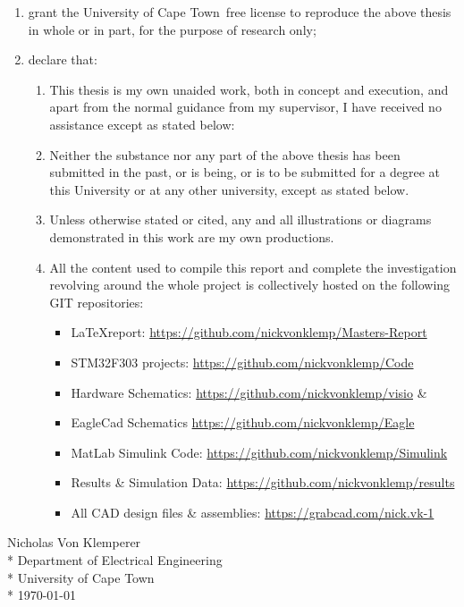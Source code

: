 \documentclass[a4paper, 11pt, oneside, openright, parskip=full]{book}
\newcommand{\auth}{Nicholas Von Klemperer}								%
\newcommand{\dept}{Department of Electrical Engineering}%
\newcommand{\uni}{University of Cape Town}				%
\newcommand*{\signature}[1]
{
	\par\noindent\makebox [5cm]{\hrulefill}
	\par\noindent\makebox [5cm][1]{#1}
}
\begin{document}
\begin{enumerate}
	\item		grant the \uni\  free license to reproduce the above thesis in whole or in part, for the purpose of research only;
	\item		declare that:
	
	\begin{enumerate}
		\item		This thesis is my own unaided work, both in concept and execution, and apart from the normal guidance from my supervisor, I have received no assistance except as stated below:
		\item		Neither the substance nor any part of the above thesis has been submitted in the past, or is being, or is to be submitted for a degree at this University or at any other university, except as stated below.
		\item		Unless otherwise stated or cited, any and all illustrations or diagrams demonstrated in this work are my own productions.
		\item 		All the content used to compile this report and complete the investigation revolving around the whole project is collectively hosted on the following GIT repositories:
		\begin{itemize}
			\item \LaTeX report: \url{https://github.com/nickvonklemp/Masters-Report}
			\item STM32F303 projects: \url{https://github.com/nickvonklemp/Code}
			\item Hardware Schematics: \url{https://github.com/nickvonklemp/visio} \&
			\item EagleCad Schematics \url{https://github.com/nickvonklemp/Eagle}
			\item MatLab Simulink Code: \url{https://github.com/nickvonklemp/Simulink}
			\item Results \& Simulation Data: \url{https://github.com/nickvonklemp/results}
			\item All CAD design files \& assemblies: \url{https://grabcad.com/nick.vk-1}
		\end{itemize}
	\end{enumerate}	
\end{enumerate}

\begin{flushright}	%
	\vskip 4cm
	\noindent \signature{x}
	\noindent \auth \\*
	\vskip 2mm
	\noindent \dept \\*
	\noindent \uni \\*
	\vskip 2mm
	\noindent \today
\end{flushright}
\end{document}
